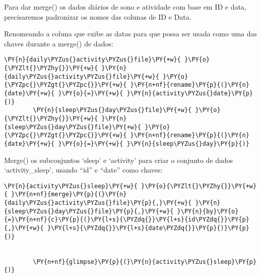 Para dar merge() os dados diários de sono e atividade com base em ID e
data, precisaremos padronizar os nomes das colunas de ID e Data.

Renomeando a coluna que exibe as datas para que possa ser usada como uma
das chaves durante a merge() de dados:

\begin{tcolorbox}[breakable, size=fbox, boxrule=1pt, pad at break*=1mm,colback=cellbackground, colframe=cellborder]
    \begin{Verbatim}[commandchars=\\\{\}]
        \PY{n}{daily\PYZus{}activity\PYZus{}file}\PY{+w}{ }\PY{o}{\PYZlt{}\PYZhy{}}\PY{+w}{ }\PY{n}{daily\PYZus{}activity\PYZus{}file}\PY{+w}{ }\PY{o}{\PYZpc{}\PYZgt{}\PYZpc{}}\PY{+w}{ }\PY{n+nf}{rename}\PY{p}{(}\PY{n}{date}\PY{+w}{ }\PY{o}{=}\PY{+w}{ }\PY{n}{activity\PYZus{}date}\PY{p}{)}
        \PY{n}{sleep\PYZus{}day\PYZus{}file}\PY{+w}{ }\PY{o}{\PYZlt{}\PYZhy{}}\PY{+w}{ }\PY{n}{sleep\PYZus{}day\PYZus{}file}\PY{+w}{ }\PY{o}{\PYZpc{}\PYZgt{}\PYZpc{}}\PY{+w}{ }\PY{n+nf}{rename}\PY{p}{(}\PY{n}{date}\PY{+w}{ }\PY{o}{=}\PY{+w}{ }\PY{n}{sleep\PYZus{}day}\PY{p}{)}
    \end{Verbatim}
\end{tcolorbox}

Merge() os subconjuntos `sleep' e `activity' para criar o conjunto de
dados `activity\_sleep', usando ``id'' e ``date'' como chaves:

\begin{tcolorbox}[breakable, size=fbox, boxrule=1pt, pad at break*=1mm,colback=cellbackground, colframe=cellborder]
    \begin{Verbatim}[commandchars=\\\{\}]
        \PY{n}{activity\PYZus{}sleep}\PY{+w}{ }\PY{o}{\PYZlt{}\PYZhy{}}\PY{+w}{ }\PY{n+nf}{merge}\PY{p}{(}\PY{n}{daily\PYZus{}activity\PYZus{}file}\PY{p}{,}\PY{+w}{ }\PY{n}{sleep\PYZus{}day\PYZus{}file}\PY{p}{,}\PY{+w}{ }\PY{n}{by}\PY{o}{=}\PY{n+nf}{c}\PY{p}{(}\PY{l+s}{\PYZdq{}}\PY{l+s}{id\PYZdq{}}\PY{p}{,}\PY{+w}{ }\PY{l+s}{\PYZdq{}}\PY{l+s}{date\PYZdq{}}\PY{p}{)}\PY{p}{)}


        \PY{n+nf}{glimpse}\PY{p}{(}\PY{n}{activity\PYZus{}sleep}\PY{p}{)}
    \end{Verbatim}
\end{tcolorbox}

